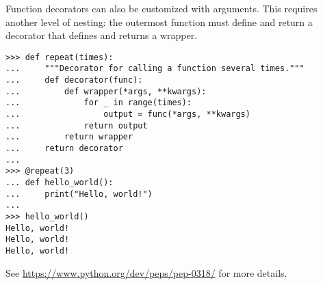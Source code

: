 Function decorators can also be customized with arguments.
This requires another level of nesting: the outermost function must define and return a decorator that defines and returns a wrapper.

\begin{lstlisting}
>>> def repeat(times):
...     """Decorator for calling a function several times."""
...     def decorator(func):
...         def wrapper(*args, **kwargs):
...             for _ in range(times):
...                 output = func(*args, **kwargs)
...             return output
...         return wrapper
...     return decorator
...
>>> @repeat(3)
... def hello_world():
...     print("Hello, world!")
...
>>> hello_world()
Hello, world!
Hello, world!
Hello, world!
\end{lstlisting}

See \url{https://www.python.org/dev/peps/pep-0318/} for more details.

\begin{comment} %
Decorating a function can overwrite the original function's docstring.
To remedy this problem, the \li{functools} module includes a decorator for wrappers.

\begin{lstlisting}
>>> from functools import wraps

>>> def typewriter(func):
...     """Decorator for printing the type of output a function returns"""
...     @wraps(func)                            # Add the @wraps tag.
...     def wrapper(*args, **kwargs):
...         output = func(*args, **kwargs)
...         print("output type:", type(output))
...         return output
...     return wrapper
...
>>> def repeat(times=2):
...     """Decorator for calling a function several times."""
...     def decorator(func):
...         @wraps(func)                        # Add the @wraps tag.
...         def wrapper(*args, **kwargs):
...             for _ in range(times):
...                 output = func(*args, **kwargs)
...             return output
...         return wrapper
...     return decorator
\end{lstlisting}
\end{comment}